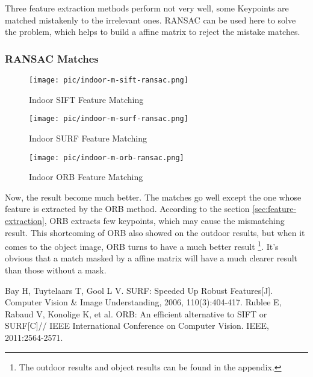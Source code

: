 \documentclass[paper=a4, fontsize=11pt]{scrartcl} %
\numberwithin{equation}{section} %
\numberwithin{figure}{section} %
\numberwithin{table}{section} %
\begin{document}

Three feature extraction methods perform not very well, some Keypoints are matched mistakenly to the irrelevant ones.
RANSAC can be used here to solve the problem, which helps to build a affine matrix to reject the mistake matches.

\subsubsection{RANSAC Matches}

\begin{figure}[H]
\centering
\texttt{[image: pic/indoor-m-sift-ransac.png]}
\caption{Indoor SIFT Feature Matching}
\label{fig:indoor-m-sift-ransac}
\end{figure}

\begin{figure}[H]
\centering
\texttt{[image: pic/indoor-m-surf-ransac.png]}
\caption{Indoor SURF Feature Matching}
\label{fig:indoor-m-surf-ransac}
\end{figure}

\begin{figure}[H]
\centering
\texttt{[image: pic/indoor-m-orb-ransac.png]}
\caption{Indoor ORB Feature Matching}
\label{fig:indoor-m-orb-ransac}
\end{figure}

Now, the result become much better. The matches go well except the one whose feature is extracted by the ORB method. 
According to the section \ref{sec:feature-extraction}, ORB extracts few keypoints, which may cause the mismatching result.
This shortcoming of ORB also showed on the outdoor results, but when it comes to the object image, ORB turns to have a much better result
\footnote{The outdoor results and object results can be found in the appendix.}.
It's obvious that a match masked by a affine matrix will have a much clearer result than those without a mask.


\renewcommand\refname{Reference}

\begin{thebibliography}{99}
Bay H, Tuytelaars T, Gool L V. SURF: Speeded Up Robust Features[J]. Computer Vision \& Image Understanding, 2006, 110(3):404-417.
Rublee E, Rabaud V, Konolige K, et al. ORB: An efficient alternative to SIFT or SURF[C]// IEEE International Conference on Computer Vision. IEEE, 2011:2564-2571.
\end{thebibliography}
\end{document}
